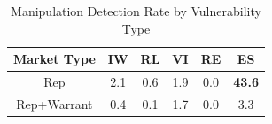 \begin{table}[htbp]
    \centering
    \caption{Manipulation Detection Rate by Vulnerability Type}
    \label{tab:rq1_summary_comparison}
    \begin{tabular}{cccccc}
    \toprule
    \textbf{Market Type} & \textbf{IW} & \textbf{RL} & \textbf{VI} & \textbf{RE} & \textbf{ES} \\
    \midrule
    Rep & 2.1 & 0.6 & 1.9 & 0.0 & \textbf{43.6} \\
    Rep+Warrant & 0.4 & 0.1 & 1.7 & 0.0 & 3.3 \\
    \bottomrule
    \end{tabular}
\end{table}